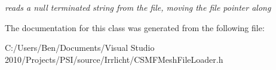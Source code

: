 \begin{DoxyCompactItemize}
\begin{DoxyCompactList}\small\item\em reads a null terminated string from the file, moving the file pointer along \end{DoxyCompactList}\end{DoxyCompactItemize}


The documentation for this class was generated from the following file\-:\begin{DoxyCompactItemize}
\item 
C\-:/\-Users/\-Ben/\-Documents/\-Visual Studio 2010/\-Projects/\-P\-S\-I/source/\-Irrlicht/C\-S\-M\-F\-Mesh\-File\-Loader.\-h\end{DoxyCompactItemize}
